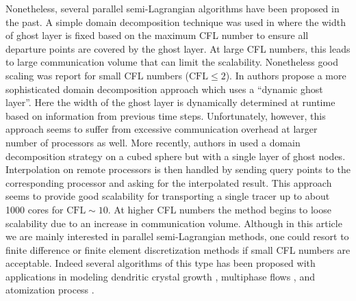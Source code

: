 Nonetheless, several parallel semi-Lagrangian algorithms have been proposed in the past. A simple domain decomposition technique was used in \cite{Thomas;Cote:95:Massively-parallel-s} where the width of ghost layer is fixed based on the maximum CFL number to ensure all departure points are covered by the ghost layer. At large CFL numbers, this leads to large communication volume that can limit the scalability. Nonetheless good scaling was report for small CFL numbers ($\text{CFL} \le 2$). In \cite{Drake;Foster;Michalakes;etal:95:Design-and-performan} authors propose a more sophisticated domain decomposition approach which uses a ``dynamic ghost layer''. Here the width of the ghost layer is dynamically determined at runtime based on information from previous time steps. Unfortunately, however, this approach seems to suffer from excessive communication overhead at larger number of processors as well. More recently, authors in \cite{White-III;Dongarra:11:High-performance-hig} used a domain decomposition strategy on a cubed sphere but with a single layer of ghost nodes. Interpolation on remote processors is then handled by sending query points to the corresponding processor and asking for the interpolated result. This approach seems to provide good scalability for transporting a single tracer up to about 1000 cores for $\text{CFL} \sim 10$. At higher CFL numbers the method begins to loose scalability due to an increase in communication volume. Although in this article we are mainly interested in parallel semi-Lagrangian methods, one could resort to finite difference or finite element discretization methods if small CFL numbers are acceptable. Indeed several algorithms of this type has been proposed with applications in modeling dendritic crystal growth \cite{Wang;Chang;Kale;etal:06:Parallelization-of-a}, multiphase flows \cite{Sussman:05:A-parallelized-adapt, Fortmeier;Bucker:11:A-parallel-strategy-, Rodriguez;Sahni;Lahey-Jr;etal:13:A-parallel-adaptive-}, and atomization process \cite{Herrmann:10:A-parallel-Eulerian-}.

